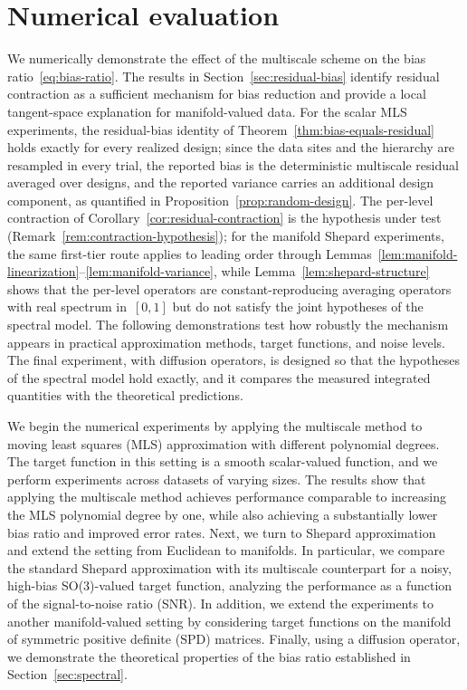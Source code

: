 \documentclass[12pt]{article}
\begin{document}
\section{Numerical evaluation}\label{sec:numerics}
We numerically demonstrate the effect of the multiscale scheme on the bias ratio~\eqref{eq:bias-ratio}. The results in Section~\ref{sec:residual-bias} identify residual contraction as a sufficient mechanism for bias reduction and provide a local tangent-space explanation for manifold-valued data. For the scalar MLS experiments, the residual-bias identity of Theorem~\ref{thm:bias-equals-residual} holds exactly for every realized design; since the data sites and the hierarchy are resampled in every trial, the reported bias is the deterministic multiscale residual averaged over designs, and the reported variance carries an additional design component, as quantified in Proposition~\ref{prop:random-design}. The per-level contraction of Corollary~\ref{cor:residual-contraction} is the hypothesis under test (Remark~\ref{rem:contraction-hypothesis}); for the manifold Shepard experiments, the same first-tier route applies to leading order through Lemmas~\ref{lem:manifold-linearization}--\ref{lem:manifold-variance}, while Lemma~\ref{lem:shepard-structure} shows that the per-level operators are constant-reproducing averaging operators with real spectrum in~$[0,1]$ but do not satisfy the joint hypotheses of the spectral model. The following demonstrations test how robustly the mechanism appears in practical approximation methods, target functions, and noise levels. The final experiment, with diffusion operators, is designed so that the hypotheses of the spectral model hold exactly, and it compares the measured integrated quantities with the theoretical predictions.

We begin the numerical experiments by applying the multiscale method to moving least squares (MLS) approximation with different polynomial degrees. The target function in this setting is a smooth scalar-valued function, and we perform experiments across datasets of varying sizes. The results show that applying the multiscale method achieves performance comparable to increasing the MLS polynomial degree by one, while also achieving a substantially lower bias ratio and improved error rates. Next, we turn to Shepard approximation~\cite{shepard1968two} and extend the setting from Euclidean to manifolds. In particular, we compare the standard Shepard approximation with its multiscale counterpart for a noisy, high-bias SO(3)-valued target function, analyzing the performance as a function of the signal-to-noise ratio (SNR). In addition, we extend the experiments to another manifold-valued setting by considering target functions on the manifold of symmetric positive definite (SPD) matrices. Finally, using a diffusion operator, we demonstrate the theoretical properties of the bias ratio established in Section~\ref{sec:spectral}.
\end{document}
